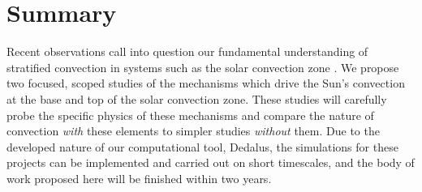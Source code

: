 \documentclass[aasms,12pt]{article}
\begin{document}
\section{Summary}
Recent observations call into question our fundamental understanding of stratified
convection in systems such as the solar convection zone \citep{hanasoge&all2012, greer&all2015}.
We propose two focused, scoped studies of the mechanisms which drive the Sun's convection at
the base and top of the solar convection zone. 
These studies will carefully probe the specific physics of these mechanisms and compare the
nature of convection \emph{with} these elements to simpler studies \emph{without} them.
Due to the developed nature of
our computational tool, Dedalus, the simulations for these projects can be implemented and
carried out on short timescales, and the body of work proposed here will be finished within
two years.


\newpage


\end{document}

